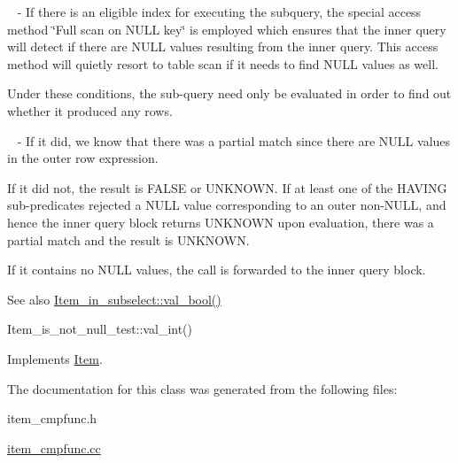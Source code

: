 ~\newline
 -\/ If there is an eligible index for executing the subquery, the special access method \char`\"{}\+Full scan on N\+U\+L\+L key\char`\"{} is employed which ensures that the inner query will detect if there are N\+U\+LL values resulting from the inner query. This access method will quietly resort to table scan if it needs to find N\+U\+LL values as well.


\begin{DoxyItemize}
\item Under these conditions, the sub-\/query need only be evaluated in order to find out whether it produced any rows.
\end{DoxyItemize}

~\newline
 -\/ If it did, we know that there was a partial match since there are N\+U\+LL values in the outer row expression.


\begin{DoxyItemize}
\item If it did not, the result is F\+A\+L\+SE or U\+N\+K\+N\+O\+WN. If at least one of the H\+A\+V\+I\+NG sub-\/predicates rejected a N\+U\+LL value corresponding to an outer non-\/N\+U\+LL, and hence the inner query block returns U\+N\+K\+N\+O\+WN upon evaluation, there was a partial match and the result is U\+N\+K\+N\+O\+WN.
\end{DoxyItemize}

If it contains no N\+U\+LL values, the call is forwarded to the inner query block.

\begin{DoxySeeAlso}{See also}
\mbox{\hyperlink{classItem__in__subselect_a137eef270a78238c1bafde29071cbbcb}{Item\+\_\+in\+\_\+subselect\+::val\+\_\+bool()}} 

Item\+\_\+is\+\_\+not\+\_\+null\+\_\+test\+::val\+\_\+int() 
\end{DoxySeeAlso}


Implements \mbox{\hyperlink{classItem}{Item}}.



The documentation for this class was generated from the following files\+:\begin{DoxyCompactItemize}
\item 
item\+\_\+cmpfunc.\+h\item 
\mbox{\hyperlink{item__cmpfunc_8cc}{item\+\_\+cmpfunc.\+cc}}\end{DoxyCompactItemize}
